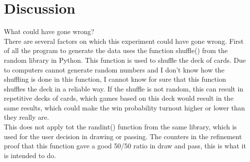 \section{Discussion}
What could have gone wrong? \\
There are several factors on which this experiment could have gone wrong. First of all the program to generate the data uses the function shuffle() from the random library in Python. This function is used to shuffle the deck of cards. Due to computers cannot generate random numbers and I don't know how the shuffling is done in this function, I cannot know for sure that this function shuffles the deck in a reliable way. If the shuffle is not random, this can result in repetitive decks of cards, which games based on this deck would result in the same results, which could make the win probability turnout higher or lower than they really are. \\ 
This does not apply tot the randint() function from the same library, which is used for the user decision in drawing or passing. The counters in the refinement proof that this function gave a good 50/50 ratio in draw and pass, this is what it is intended to do.
 